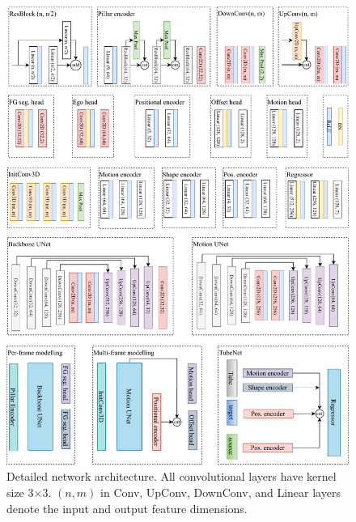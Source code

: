 \begin{figure}[t]
     \centering
        \includegraphics[width=\columnwidth]{figs/figure/network.pdf}
       \caption{Detailed network architecture. All convolutional layers have kernel size 3$\times$3. $(n, m)$ in Conv, UpConv, DownConv, and Linear layers denote the input and output feature dimensions.} 
   \label{fig:supp_network}
\end{figure}